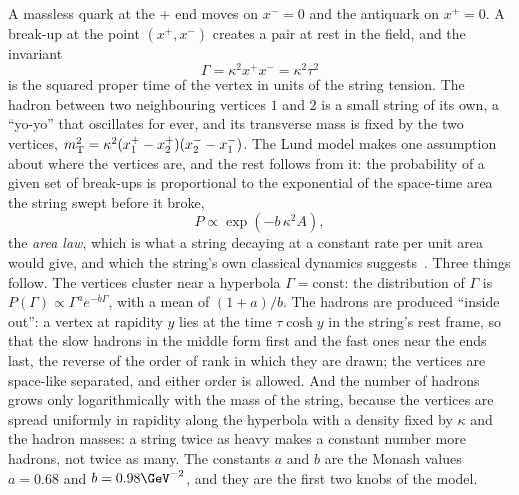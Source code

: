 A massless quark at the $+$ end moves on $x^-=0$ and the antiquark on
$x^+=0$. A break-up at the point $(x^+,x^-)$
creates a pair at rest in the field, and the invariant
\begin{equation}
  \Gamma=\kappa^2x^+x^-=\kappa^2\tau^2
  \label{eq:children_getting_married:gamma}
\end{equation}
is the squared proper time of the vertex in units of the string tension.
The hadron between two neighbouring vertices $1$ and $2$ is a small string
of its own, a ``yo-yo'' that oscillates for ever, and its transverse mass
is fixed by the two vertices, $m_{\mathrm{T}}^2=\kappa^2(x_1^+-x_2^+)(x_2^--x_1^-)$.
The Lund model makes one assumption about where the vertices are, and the
rest follows from it: the probability of a given set of break-ups is
proportional to the exponential of the space-time area the string swept
before it broke,
\begin{equation}
  P\propto\exp(-b\,\kappa^2A),
  \label{eq:children_getting_married:area_law}
\end{equation}
the \emph{area law}, which is what a string decaying at a constant rate per
unit area would give, and which the string's own classical dynamics
suggests~\cite{Artru:1974hr}. Three things follow. The vertices cluster
near a hyperbola $\Gamma=\mathrm{const}$: the distribution of $\Gamma$ is
$P(\Gamma)\propto\Gamma^a e^{-b\Gamma}$, with a mean of $(1+a)/b$. The
hadrons are produced ``inside out'': a vertex at rapidity $y$ lies at the
time $\tau\cosh y$ in the string's rest frame, so that the slow hadrons in
the middle form first and the fast ones near the ends last, the reverse of
the order of rank in which they are drawn; the vertices are space-like
separated, and either order is allowed. And the number of hadrons grows only logarithmically with
the mass of the string, because the vertices are spread uniformly in
rapidity along the hyperbola with a density fixed by $\kappa$ and the
hadron masses: a string twice as heavy makes a constant number more
hadrons, not twice as many. The constants $a$ and $b$ are the Monash
values $a=0.68$ and $b=0.98\GeV^{-2}$, and they are the first two knobs of
the model.

